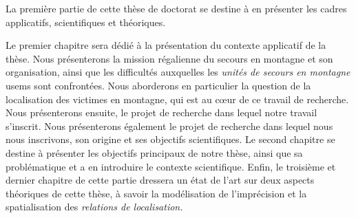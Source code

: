 La première partie de cette thèse de doctorat se destine à en
présenter les cadres applicatifs, scientifiques et théoriques.

Le premier chapitre sera dédié à la présentation du contexte
applicatif de la thèse. Nous présenterons la mission régalienne du
secours en montagne et son organisation, ainsi que les difficultés
auxquelles les \emph{unités de secours en montagne} \acp{usem} sont
confrontées. Nous aborderons en particulier la question de la
localisation des victimes en montagne, qui est au cœur de ce travail
de recherche. Nous présenterons ensuite, le projet de recherche dans
lequel notre travail s'inscrit. Nous présenterons également le projet
de recherche dans lequel nous nous inscrivons, son origine et ses
objectifs scientifiques.  Le second chapitre se destine à présenter
les objectifs principaux de notre thèse, ainsi que sa problématique et
a en introduire le contexte scientifique.  Enfin, le troisième et
dernier chapitre de cette partie dressera un état de l'art sur deux
aspects théoriques de cette thèse, à savoir la modélisation de
l'imprécision et la spatialisation des \emph{relations de
  localisation.}

